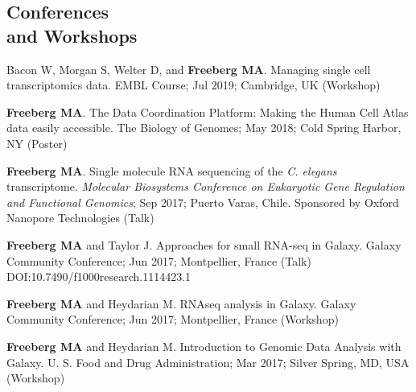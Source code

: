 \documentclass[margin,line]{res}
\begin{document}
\begin{resume}



\section{\sc Conferences\\ and Workshops}

Bacon W, Morgan S, Welter D, and {\bf Freeberg MA}. Managing single cell transcriptomics data. EMBL Course; Jul 2019; Cambridge, UK (Workshop)

{\bf Freeberg MA}. The Data Coordination Platform: Making the Human Cell Atlas data easily accessible. The Biology of Genomes; May 2018; Cold Spring Harbor, NY (Poster)

{\bf Freeberg MA}. Single molecule RNA sequencing of the {\em C. elegans} transcriptome. {\em Molecular Biosystems Conference on Eukaryotic Gene Regulation and Functional Genomics}; Sep 2017; Puerto Varas, Chile. Sponsored by Oxford Nanopore Technologies (Talk)

{\bf Freeberg MA} and Taylor J. Approaches for small RNA-seq in Galaxy. Galaxy Community Conference; Jun 2017; Montpellier, France (Talk)
DOI:10.7490/f1000research.1114423.1


{\bf Freeberg MA} and Heydarian M. RNAseq analysis in Galaxy. Galaxy Community Conference; Jun 2017; Montpellier, France (Workshop)

{\bf Freeberg MA} and Heydarian M. Introduction to Genomic Data Analysis with Galaxy. U. S. Food and Drug Administration; Mar 2017; Silver Spring, MD, USA (Workshop)



\end{resume}
\end{document}
